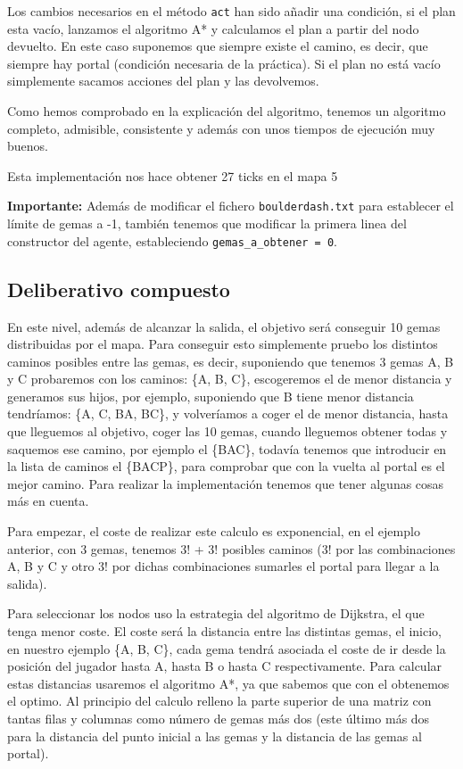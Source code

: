 \documentclass[10pt, spanish]{article}
\begin{document}
Los cambios necesarios en el método \texttt{act} han sido añadir una condición, si el plan esta vacío, lanzamos el algoritmo A* y calculamos el plan a partir del nodo devuelto. En este caso suponemos que siempre existe el camino, es decir, que siempre hay portal (condición necesaria de la práctica). Si el plan no está vacío simplemente sacamos acciones del plan y las devolvemos.

Como hemos comprobado en la explicación del algoritmo, tenemos un algoritmo completo, admisible, consistente y además con unos tiempos de ejecución muy buenos.



Esta implementación nos hace obtener 27 ticks en el mapa 5

\textbf{Importante:} Además de modificar el fichero \texttt{boulderdash.txt} para establecer el límite de gemas a -1, también tenemos que modificar la primera linea del constructor del agente, estableciendo \texttt{gemas\_a\_obtener = 0}.

\subsection{Deliberativo compuesto}

En este nivel, además de alcanzar la salida, el objetivo será conseguir 10 gemas distribuidas por el mapa. Para conseguir esto simplemente pruebo los distintos caminos posibles entre las gemas, es decir, suponiendo que tenemos 3 gemas A, B y C probaremos con los caminos: \{A, B, C\}, escogeremos el de menor distancia y generamos sus hijos, por ejemplo, suponiendo que B tiene menor distancia tendríamos: \{A, C, BA, BC\}, y volveríamos a coger el de menor distancia, hasta que lleguemos al objetivo, coger las 10 gemas, cuando lleguemos obtener todas y saquemos ese camino, por ejemplo el \{BAC\}, todavía tenemos que introducir en la lista de caminos el \{BACP\}, para comprobar que con la vuelta al portal es el mejor camino. Para realizar la implementación tenemos que tener algunas cosas más en cuenta.

Para empezar, el coste de realizar este calculo es exponencial, en el ejemplo anterior, con 3 gemas, tenemos 3! + 3! posibles caminos (3! por las combinaciones A, B y C y otro 3! por dichas combinaciones sumarles el portal para llegar a la salida).

Para seleccionar los nodos uso la estrategia del algoritmo de Dijkstra, el que tenga menor coste. El coste será la distancia entre las distintas gemas, el inicio, en nuestro ejemplo \{A, B, C\}, cada gema tendrá asociada el coste de ir desde la posición del jugador hasta A, hasta B o hasta C respectivamente. Para calcular estas distancias usaremos el algoritmo A*, ya que sabemos que con el obtenemos el optimo. Al principio del calculo relleno la parte superior de una matriz con tantas filas y columnas como número de gemas más dos (este último más dos para la distancia del punto inicial a las gemas y la distancia de las gemas al portal).
\end{document}
